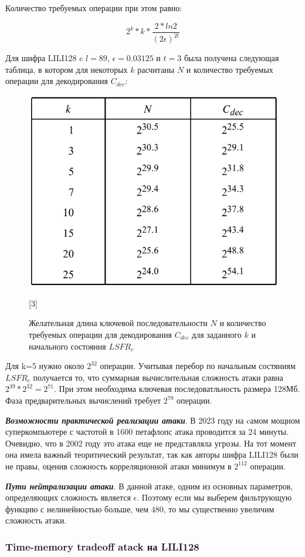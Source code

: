 \documentclass[colorthm]{./civarticle}
\begin{document}
Количество требуемых операции при этом равно:

\begin{equation}
    2^k*k*\frac{2*ln2}{(2\epsilon)^{2t}}
\end{equation}

Для шифра LILI128 c $l=89$, $\epsilon=0.03125$ и $t=3$ была получена следующая таблица, в котором для некоторых $k$ расчитаны $N$ и количество требуемых операции для декодирования $C_{dec}$:

\begin{figure}[H]
    \centering
    \includegraphics[width=0.5\linewidth]{Снимок экрана 2024-01-09 112308.png}
    \caption{Желательная длина ключевой последовательности $N$ и количество требуемых операции для декодирования $C_{dec}$ для заданного $k$ и начального состояния $LSFR_c$} [3]
    \label{fig:enter-label}
\end{figure}

Для k=5 нужно около $2^{32}$ операции. Учитывая перебор по начальным состяниям $LSFR_c$ получается то, что суммарная вычислительная сложность атаки равна $2^{39}*2^{32} = 2^{71}$. При этом необходима ключевая последоватльность размера 128Мб. Фаза предварительных вычислений требует $2^{79}$ операции.

\textbf{\emph{Возможности практической реализации атаки}}. В 2023 году на cамом мощном суперкомпьютере с частотой в 1600 петафлопс атака проводится за 24 минуты. Очевидно, что в 2002 году это атака еще не представляла угрозы. На тот момент она имела важный теоритический результат, так как авторы шифра LILI128 были не правы, оценив сложность корреляционной атаки минимум в $2^{112}$ операции.

\textbf{\emph{Пути нейтрализации атаки}}. В данной атаке, одним из основных параметров, определяющих сложность является $\epsilon$. Поэтому если мы выберем фильтрующую функцию с нелинейностью больше, чем 480, то мы существенно увеличим сложность атаки.


\subsubsection{Time-memory tradeoff atack на LILI128}
\end{document}
